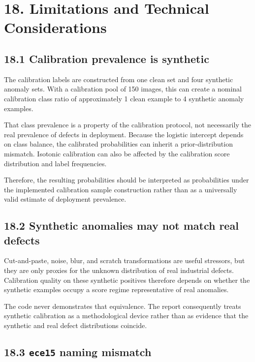 \documentclass[
  11pt,
]{article}
\begin{document}
\section{18. Limitations and Technical
Considerations}\label{limitations-and-technical-considerations}

\subsection{18.1 Calibration prevalence is
synthetic}\label{calibration-prevalence-is-synthetic}

The calibration labels are constructed from one clean set and four
synthetic anomaly sets. With a calibration pool of 150 images, this can
create a nominal calibration class ratio of approximately 1 clean
example to 4 synthetic anomaly examples.

That class prevalence is a property of the calibration protocol, not
necessarily the real prevalence of defects in deployment. Because the
logistic intercept depends on class balance, the calibrated
probabilities can inherit a prior-distribution mismatch. Isotonic
calibration can also be affected by the calibration score distribution
and label frequencies.

Therefore, the resulting probabilities should be interpreted as
probabilities under the implemented calibration sample construction
rather than as a universally valid estimate of deployment prevalence.

\subsection{18.2 Synthetic anomalies may not match real
defects}\label{synthetic-anomalies-may-not-match-real-defects}

Cut-and-paste, noise, blur, and scratch transformations are useful
stressors, but they are only proxies for the unknown distribution of
real industrial defects. Calibration quality on these synthetic
positives therefore depends on whether the synthetic examples occupy a
score regime representative of real anomalies.

The code never demonstrates that equivalence. The report consequently
treats synthetic calibration as a methodological device rather than as
evidence that the synthetic and real defect distributions coincide.

\subsection{\texorpdfstring{18.3 \texttt{ece15} naming
mismatch}{18.3 ece15 naming mismatch}}\label{ece15-naming-mismatch}
\end{document}

